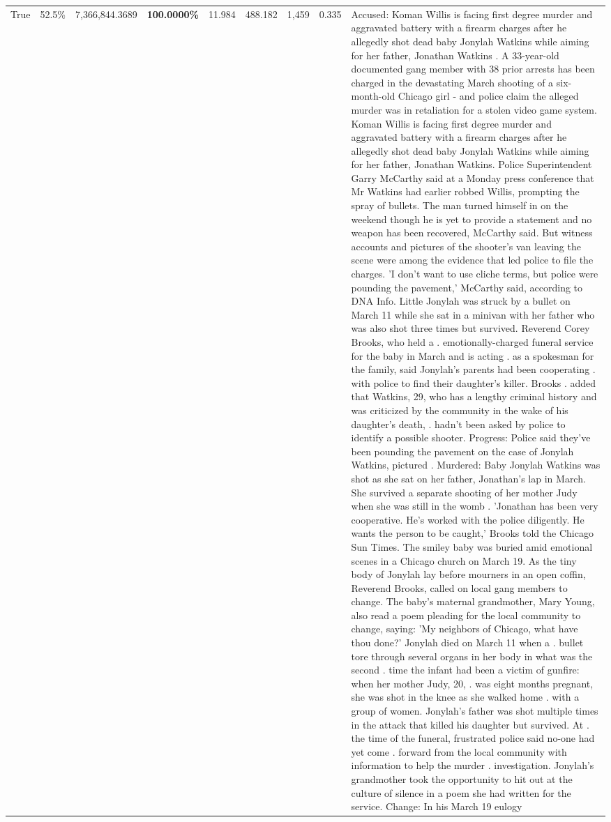 \begin{table}[H]
\begin{tabular}{lllrlllll}
True & 52.5\% & 7,366,844.3689 & \bfseries \color{red} 100.0000\% & 11.984 & 488.182 & 1,459 & 0.335 & Accused: Koman Willis is facing first degree murder and aggravated battery with a firearm charges after he allegedly shot dead baby Jonylah Watkins while aiming for her father, Jonathan Watkins . A 33-year-old documented gang member with 38 prior arrests has been charged in the devastating March shooting of a six-month-old Chicago girl - and police claim the alleged murder was in retaliation for a stolen video game system. Koman Willis is facing first degree murder and aggravated battery with a firearm charges after he allegedly shot dead baby Jonylah Watkins while aiming for her father, Jonathan Watkins. Police Superintendent Garry McCarthy said at a Monday press conference that Mr Watkins had earlier robbed Willis, prompting the spray of bullets. The man turned himself in on the weekend though he is yet to provide a statement and no weapon has been recovered, McCarthy said. But witness accounts and pictures of the shooter's van leaving the scene were among the evidence that led police to file the charges. 'I don't want to use cliche terms, but police were pounding the pavement,' McCarthy said, according to DNA Info. Little Jonylah was struck by a bullet on March 11 while she sat in a minivan with her father who was also shot three times but survived. Reverend Corey Brooks, who held a . emotionally-charged funeral service for the baby in March and is acting . as a spokesman for the family, said Jonylah's parents had been cooperating . with police to find their daughter's killer. Brooks . added that Watkins, 29, who has a lengthy criminal history and was criticized by the community in the wake of his daughter's death, . hadn't been asked by police to identify a possible shooter. Progress: Police said they've been pounding the pavement on the case of Jonylah Watkins, pictured . Murdered: Baby Jonylah Watkins was shot as she sat on her father, Jonathan's lap in March. She survived a separate shooting of her mother Judy when she was still in the womb . 'Jonathan has been very cooperative. He's worked with the police diligently. He wants the person to be caught,' Brooks told the Chicago Sun Times. The smiley baby was buried amid emotional scenes in a Chicago church on March 19. As the tiny body of Jonylah lay before mourners in an open coffin, Reverend Brooks, called on local gang members to change. The baby's maternal grandmother, Mary Young, also read a poem pleading for the local community to change, saying: 'My neighbors of Chicago, what have thou done?' Jonylah died on March 11 when a . bullet tore through several organs in her body in what was the second . time the infant had been a victim of gunfire: when her mother Judy, 20, . was eight months pregnant, she was shot in the knee as she walked home . with a group of women. Jonylah's father was shot multiple times in the attack that killed his daughter but survived. At . the time of the funeral, frustrated police said no-one had yet come . forward from the local community with information to help the murder . investigation. Jonylah's grandmother took the opportunity to hit out at the culture of silence in a poem she had written for the service. Change: In his March 19 eulogy 
\end{tabular}
\end{table}
